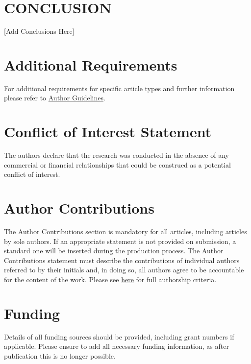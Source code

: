 \documentclass[utf8]{frontiersSCNS}
\begin{document}
\section{CONCLUSION}

[Add Conclusions Here]


\section{Additional Requirements}

For additional requirements for specific article types and further information please refer to \href{http://www.frontiersin.org/about/AuthorGuidelines#AdditionalRequirements}{Author Guidelines}.

\section*{Conflict of Interest Statement}

The authors declare that the research was conducted in the absence of any commercial or financial relationships that could be construed as a potential conflict of interest.

\section*{Author Contributions}

The Author Contributions section is mandatory for all articles, including articles by sole authors. If an appropriate statement is not provided on submission, a standard one will be inserted during the production process. The Author Contributions statement must describe the contributions of individual authors referred to by their initials and, in doing so, all authors agree to be accountable for the content of the work. Please see  \href{http://home.frontiersin.org/about/author-guidelines#AuthorandContributors}{here} for full authorship criteria.

\section*{Funding}
Details of all funding sources should be provided, including grant numbers if applicable. Please ensure to add all necessary funding information, as after publication this is no longer possible.
\end{document}
